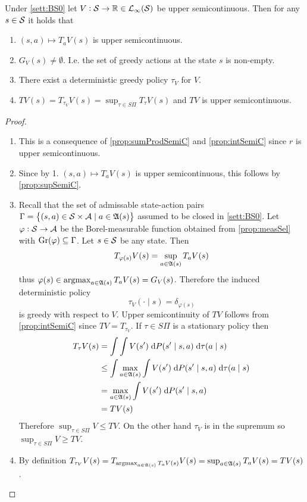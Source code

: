\begin{prop}
  Under \cref{sett:BS0}
  let $V:\mathcal{S} \to \mathbb{R} \in \mathcal{L}_\infty(\mathcal{S})$ be upper semicontinuous.
  Then for any $s \in \mathcal{S}$ it holds that
  \leavevmode
  \begin{enumerate}
    \item $(s, a) \mapsto T_a V(s)$ is upper semicontinuous.
    \item $G_V(s) \neq \emptyset$. 
      I.e. the set of greedy actions at the state $s$ is non-empty.
    \item There exist a deterministic greedy policy $\tau_V$ for $V$.
    \item $TV(s) = T_{\tau_V} V(s) = \sup_{\tau \in S\Pi} T_\tau V(s)$
	and $TV$ is upper semicontinuous.
  \end{enumerate}
  \label{prop:greedyExi}
\end{prop}
\begin{proof}
  \leavevmode
  \begin{enumerate}
    \item This is a consequence of \cref{prop:sumProdSemiC}
      and \cref{prop:intSemiC} since $r$ is upper semicontinuous.
    \item Since by 1. $(s, a) \mapsto T_a V(s)$ is upper semicontinuous, this
      follows by \cref{prop:supSemiC}.
    \item Recall that the set of admissable state-action pairs
      $\Gamma = \left\{ (s, a) \in \mathcal{S} \times \mathcal{A} 
      \mid a \in \frak{A}(s) \right\}$ assumed to be closed in
      \cref{sett:BS0}.
      Let $\varphi : \mathcal{S} \to \mathcal{A}$ be the Borel-measurable function
      obtained from \cref{prop:measSel}
      with $\mathrm{Gr}(\varphi) \subseteq \Gamma$.
      Let $s \in \mathcal{S}$ be any state. Then
      \[ T_{\varphi(s)} V(s) = \sup_{a \in \frak{A}(s)} T_a V(s) \]
      thus $\varphi(s) \in \operatorname*{argmax}_{a \in \frak{A}(s)} T_a V(s) = G_V(s)$.
      Therefore the induced deterministic policy
      \[ \tau_V(\cdot \mid s) = \delta_{\varphi(s)} \]
      is greedy with respect to $V$. Upper semicontinuity of $TV$ follows
      from \cref{prop:intSemiC} since $TV = T_{\tau_V}$.
      If $\tau \in S\Pi$ is a stationary policy then
      \begin{align*}
	T_\tau V(s) &=
	\int \int V(s') \; \mathrm{d} P(s' \mid s, a) \; \mathrm{d} \tau(a \mid s)
	\\ & \leq \int \max_{a \in \frak{A}(s)} \int V(s') \; \mathrm{d} P(s' \mid s, a)
	\; \mathrm{d} \tau(a \mid s)
	\\ & = \max_{a \in \frak{A}(s)} \int V(s') \; \mathrm{d} P(s' \mid s, a)
	\\ & = TV(s)
      \end{align*}
      Therefore $\sup_{\tau \in S\Pi} V \leq TV$. On the other hand
      $\tau_V$ is in the supremum so
      $\sup_{\tau \in S\Pi} V \geq TV$.
    \item By definition $T_{\tau_V} V(s) = T_{\operatorname*{argmax}_{a \in \frak{A}(s)} T_a V(s)}
      V(s) = \sup_{a \in \frak{A}(s)} T_a V(s) = TV(s)$.
  \end{enumerate}
\end{proof}

